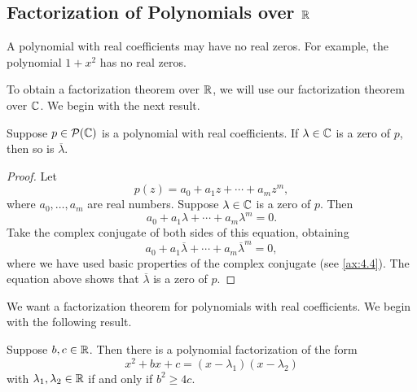 \subsection{\texorpdfstring{Factorization of Polynomials over $\mathbb{R}$}%
{Factorization of Polynomials over R}}

%
A polynomial with real coefficients may have no real zeros. For example, the
polynomial $1+x^2$ has no real zeros.

To obtain a factorization theorem over $\mathbb{R}$, we will use our factorization
theorem over $\mathbb{C}$. We begin with the next result.

\begin{result}\label{ax:4.14}
Suppose $p\in\mathcal{P}(\mathbb{C})$ is a polynomial with real coefficients. If
$\lambda\in\mathbb{C}$ is a zero of $p$, then so is $\overline{\lambda}$.
\end{result}

\begin{proof}
Let
\[ p(z) = a_0+a_1z+\cdots+a_mz^m, \]
where $a_0,\dots,a_m$ are real numbers. Suppose $\lambda\in\mathbb{C}$ is a zero of
$p$. Then
\[ a_0+a_1\lambda+\cdots+a_m\lambda^m = 0. \]
Take the complex conjugate of both sides of this equation, obtaining
\[ a_0+a_1\overline{\lambda}+\cdots+a_m\overline{\lambda}^m = 0, \]
where we have used basic properties of the complex conjugate (see
\ref{ax:4.4}). The equation above shows that $\overline{\lambda}$ is a zero of
$p$.
\end{proof}

%
We want a factorization theorem for polynomials with real coefficients. We
begin with the following result.

\begin{result}\label{ax:4.15}
Suppose $b,c\in\mathbb{R}$. Then there is a polynomial factorization of the form
\[ x^2+bx+c = (x-\lambda_1)(x-\lambda_2) \]
with $\lambda_1,\lambda_2\in\mathbb{R}$ if and only if $b^2\ge4c$.
\end{result}

